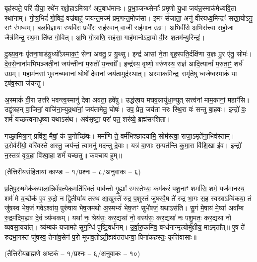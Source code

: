 बृह॑स्पते॒ परि॑ दीया॒ रथे॑न रक्षो॒हाऽमित्राꣳ॑ अप॒बाध॑मानः। प्र॒भ॒ञ्जन्थ्सेनाः᳚ प्रमृ॒णो यु॒धा जय॑न्न॒स्माक॑मेध्यवि॒ता रथा॑नाम्। गो॒त्र॒भिदं॑ गो॒विदं॒ वज्र॑बाहुं॒ जय॑न्त॒मज्म॑ प्रमृ॒णन्त॒मोज॑सा। इ॒मꣳ स॑जाता॒ अनु॑ वीरयध्व॒मिन्द्रꣳ॑ सखा॒योऽनु॒ सꣳ र॑भध्वम्। ब॒ल॒वि॒ज्ञा॒यः स्थवि॑रः॒ प्रवी॑रः॒ सह॑स्वान् वा॒जी सह॑मान उ॒ग्रः। अ॒भिवी॑रो अ॒भिस॑त्त्वा सहो॒जा जैत्र॑मिन्द्र॒ रथ॒मा ति॑ष्ठ गो॒वित्। अ॒भि गो॒त्राणि॒ सह॑सा॒ गाह॑मानोऽदा॒यो वी॒रः श॒तम॑न्यु॒रिन्द्रः॑।

दु॒श्च्य॒व॒नः पृ॑तना॒षाड॑यु॒ध्यो᳚\-ऽस्माक॒ꣳ॒ सेना॑ अवतु॒ प्र यु॒थ्सु। इन्द्र॑ आसां ने॒ता बृह॒स्पति॒र्दक्षि॑णा य॒ज्ञः पु॒र ए॑तु॒ सोमः॑। दे॒व॒से॒नाना॑मभिभञ्जती॒नां जय॑न्तीनां म॒रुतो॑ य॒न्त्वग्रे᳚। इन्द्र॑स्य॒ वृष्णो॒ वरु॑णस्य॒ राज्ञ॑ आदि॒त्यानां᳚ म॒रुता॒ꣳ॒ शर्ध॑ उ॒ग्रम्। म॒हाम॑नसां भुवनच्य॒वानां॒ घोषो॑ दे॒वानां॒ जय॑ता॒मुद॑स्थात्। अ॒स्माक॒मिन्द्रः॒ समृ॑तेषु ध्व॒जेष्व॒स्माकं॒ या इष॑व॒स्ता ज॑यन्तु।

अ॒स्माकं॑ वी॒रा उत्त॑रे भवन्त्व॒स्मानु॑ देवा अवता॒ हवे॑षु। उद्ध॑र्‌षय मघव॒न्नायु॑धा॒न्युत् सत्त्व॑नां माम॒कानां॒ महाꣳ॑सि। उद्वृ॑त्रहन् वा॒जिनां॒ वाजि॑ना॒न्युद्रथा॑नां॒ जय॑तामेतु॒ घोषः॑। उप॒ प्रेत॒ जय॑ता नरः स्थि॒रा वः॑ सन्तु बा॒हवः॑। इन्द्रो॑ वः॒ शर्म॑ यच्छत्त्वनाधृ॒ष्या यथाऽस॑थ। अव॑सृष्टा॒ परा॑ पत॒ शर॑व्ये॒ ब्रह्म॑सꣳशिता।

गच्छा॒मित्रा॒न् प्रवि॑श॒ मैषां॒ कं च॒नोच्छि॑षः। मर्मा॑णि ते॒ वर्म॑भिश्छादयामि॒ सोम॑स्त्वा॒ राजा॒ऽमृते॑ना॒भिव॑स्ताम्। उ॒रोर्वरी॑यो॒ वरि॑वस्ते अस्तु॒ जय॑न्तं॒ त्वामनु॑ मदन्तु दे॒वाः। यत्र॑ बा॒णाः स॒म्पत॑न्ति कुमा॒रा वि॑शि॒खा इ॑व। इन्द्रो॑ न॒स्तत्र॑ वृत्र॒हा वि॑श्वा॒हा शर्म॑ यच्छतु॥
कवचाय हुम्॥

{\small\closesection}

\centerline{\scriptsize (तैत्तिरीयसंहितायां काण्डः – १/प्रश्नः – ८/अनुवाकः – ६)}

प्र॒ति॒पू॒रु॒षमेक॑कपाला॒न्निर्व॑प॒त्येक॒मति॑रिक्तं॒ याव॑न्तो गृ॒ह्याः᳚ स्मस्तेभ्यः॒ कम॑करं पशू॒नाꣳ शर्मा॑सि॒ शर्म॒ यज॑मानस्य॒ शर्म॑ मे य॒च्छैक॑ ए॒व रु॒द्रो न द्वि॒तीया॑य तस्थ आ॒खुस्ते॑ रुद्र प॒शुस्तं जु॑षस्वै॒ष ते॑ रुद्र भा॒गः स॒ह स्वस्राऽम्बि॑कया॒ तं जु॑षस्व भेष॒जं गवेऽश्वा॑य॒ पुरु॑षाय भेष॒जमथो॑ अ॒स्मभ्यं॑ भेष॒जꣳ सुभे॑षजं॒ यथाऽस॑ति। सु॒गं मे॒षाय॑ मे॒ष्या॑ अवा᳚म्ब रु॒द्रम॑दिम॒ह्यव॑ दे॒वं त्र्य॑म्बकम्। यथा॑ नः॒ श्रेय॑सः॒ कर॒द्यथा॑ नो॒ वस्य॑सः॒ कर॒द्यथा॑ नः पशु॒मतः॒ कर॒द्यथा॑ नो व्यवसा॒यया᳚त्। त्र्य॑म्बकं यजामहे सुग॒न्धिं पु॑ष्टि॒वर्ध॑नम्। उ॒र्वा॒रु॒कमि॑व॒ बन्ध॑नान्मृ॒त्योर्मु॑क्षीय॒ माऽमृता᳚त्॥ ए॒ष ते॑ रुद्रभा॒गस्तं जु॑षस्व॒ तेना॑व॒सेन॑ प॒रो मूज॑व॒तोऽती॒ह्यव॑ततधन्वा॒ पिना॑कहस्तः॒ कृत्ति॑वासाः॥

\centerline{\scriptsize (तैत्तिरीयब्राह्मणे अष्टकं – १/प्रश्नः – ६/अनुवाकः – १०)}

